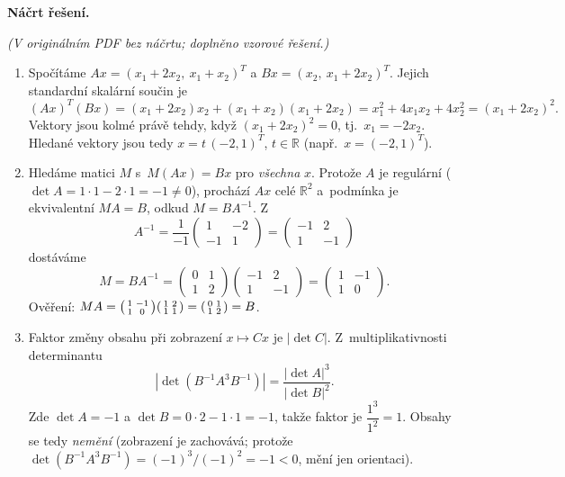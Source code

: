 \medskip
\noindent\textbf{Náčrt řešení.}\par
\textit{(V originálním PDF bez náčrtu; doplněno vzorové řešení.)}
\begin{enumerate}
  \item Spočítáme $Ax=(x_1+2x_2,\ x_1+x_2)^T$ a $Bx=(x_2,\ x_1+2x_2)^T$. Jejich standardní skalární součin je
    \[
      (Ax)^T(Bx)=(x_1+2x_2)x_2+(x_1+x_2)(x_1+2x_2)=x_1^2+4x_1x_2+4x_2^2=(x_1+2x_2)^2.
    \]
    Vektory jsou kolmé právě tehdy, když $(x_1+2x_2)^2=0$, tj.\ $x_1=-2x_2$. Hledané vektory jsou tedy $x=t\,(-2,1)^T$, $t\in\mathbb{R}$ (např.\ $x=(-2,1)^T$).
  \item Hledáme matici $M$ s~$M(Ax)=Bx$ pro \emph{všechna} $x$. Protože $A$ je regulární ($\det A=1\cdot1-2\cdot1=-1\neq0$), prochází $Ax$ celé $\mathbb{R}^2$ a~podmínka je ekvivalentní $MA=B$, odkud $M=BA^{-1}$. Z
    \[
      A^{-1}=\frac{1}{-1}\begin{pmatrix}1&-2\\-1&1\end{pmatrix}=\begin{pmatrix}-1&2\\1&-1\end{pmatrix}
    \]
    dostáváme
    \[
      M=BA^{-1}=\begin{pmatrix}0&1\\1&2\end{pmatrix}\begin{pmatrix}-1&2\\1&-1\end{pmatrix}=\begin{pmatrix}1&-1\\1&0\end{pmatrix}.
    \]
    Ověření: $MA=\begin{psmallmatrix}1&-1\\1&0\end{psmallmatrix}\begin{psmallmatrix}1&2\\1&1\end{psmallmatrix}=\begin{psmallmatrix}0&1\\1&2\end{psmallmatrix}=B$.
  \item Faktor změny obsahu při zobrazení $x\mapsto Cx$ je $|\det C|$. Z~multiplikativnosti determinantu
    \[
      |\det(B^{-1}A^3B^{-1})|=\frac{|\det A|^3}{|\det B|^2}.
    \]
    Zde $\det A=-1$ a $\det B=0\cdot2-1\cdot1=-1$, takže faktor je $\dfrac{1^3}{1^2}=1$. Obsahy se tedy \emph{nemění} (zobrazení je zachovává; protože $\det(B^{-1}A^3B^{-1})=(-1)^3/(-1)^2=-1<0$, mění jen orientaci).
\end{enumerate}
